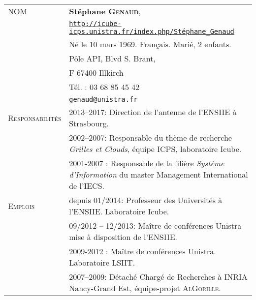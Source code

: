 
\setlength{\tabcolsep}{5pt}
\noindent
\begin{tabular}{lp{13.7cm}}
\textsc{NOM}		&{\bf Stéphane \textsc{Genaud}}, \\
					  & \texttt{\url{http://icube-icps.unistra.fr/index.php/Stéphane\_Genaud}}\\
				& Né le 10 mars 1969. Français. Marié, 2 enfants. \\
				  & Pôle API, Blvd S. Brant,\\
				  & F-67400 Illkirch\\
				  & Tél. : 03 68 85 45 42\\ 
				 & \texttt{genaud@unistra.fr}\\[5mm]
\hline
\textsc{Responsabilités} & 2013--2017: Direction de l'antenne de l'ENSIIE à Strasbourg.\\[2mm]
				 & 2002--2007: Responsable du thème de recherche \textit{Grilles et Clouds}, équipe ICPS, laboratoire Icube.\\[2mm]
				 & 2001-2007 : Responsable de la filière \textit{Système d'Information} du master Management International de l'IECS.\\[2mm]

\hline
\textsc{Emplois} 		& depuis 01/2014: Professeur des Universités à l'ENSIIE. Laboratoire Icube.\\
				& 09/2012 -- 12/2013: Maître de conférences Unistra mise à disposition de l'ENSIIE.\\[2mm]
			      & 2009-2012 : Maître de conférences Unistra. Laboratoire LSIIT.\\[2mm]
 	                      & 2007--2009: Détaché Chargé de Recherches à INRIA
                            Nancy-Grand Est, équipe-projet \textsc{AlGorille}.\\[2mm]


\end{tabular}
